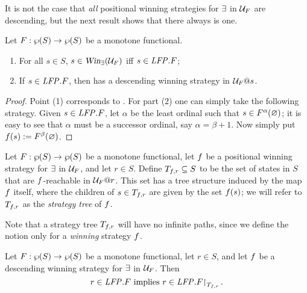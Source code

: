 It is not the case that \emph{all} positional winning strategies for $\exists$ 
in $\mathcal{U}_{F}$ are descending, but the next result shows that there always is one.

\begin{proposition}
\label{p:unfg}
Let $F: \wp(S)\to \wp(S)$ be a monotone functional. 
\begin{enumerate}[(1)]
\item
For all $s \in S$, $s \in \win_{\eloise}(\UG_{F})$ iff $s \in \mathit{LFP}. F$;
\item 
If $s \in \mathit{LFP}. F$, then \eloise has a descending winning strategy in 
$\mathcal{U}_{F}@s$.
\end{enumerate}
\end{proposition}

\begin{proof}
Point (1) corresponds to \cite[Theorem 3.14(2)]{Ven08}.
For part (2) one can simply take the following strategy.
Given $s \in \mathit{LFP}.F$, let $\alpha$ be the least ordinal such that $s \in 
F^{\alpha}(\varnothing)$; it is easy to see that $\alpha$ must be a successor ordinal,
say $\alpha = \beta + 1$. 
Now simply put $f(s) \mathrel{:=}  F^{\beta}(\varnothing)$.
\end{proof}

\begin{definition}
\label{d:str-tree}
Let $F: \wp(S)\to \wp(S)$ be a monotone functional, let $f$ be a 
positional winning strategy for $\exists$ in $\mathcal{U}_{F}$, and let $r \in S$. 
Define $T_{f,r} \subseteq S$ to be the set of states in $S$ that are 
$f$-reachable in $\mathcal{U}_{F}@r$.
This set has a tree structure induced by the map $f$ itself, where the 
children of $s \in T_{f,r}$ are given by the set $f(s)$; we will
refer to $T_{f,r}$ as the \emph{strategy tree} of
$f$.
\end{definition}
Note that a strategy tree $T_{f,r}$ will have no infinite paths, since we
define the notion only for a \emph{winning} strategy $f$.

\begin{proposition}
\label{p:afmc-2}
Let $F: \wp(S)\to \wp(S)$ be a monotone functional, let $r \in S$, and let 
$f$ be a descending winning strategy for $\exists$ in $\mathcal{U}_{F}$.
Then
\begin{equation}
\label{eq:afmc3}
r \in \LFP. F \text{ implies } r \in \LFP. F\rst{T_{\ystrat,r}}.
\end{equation}
\end{proposition}

